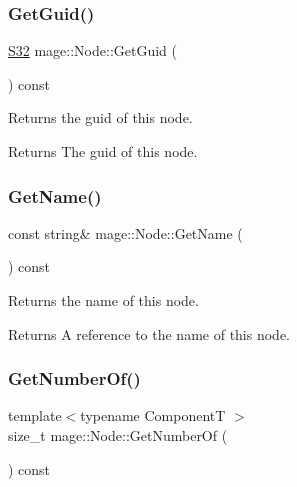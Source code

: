 \subsubsection{\texorpdfstring{Get\+Guid()}{GetGuid()}}
{\footnotesize\ttfamily \hyperlink{namespacemage_a642e05c5c83642b6946703615cdbf2da}{S32} mage\+::\+Node\+::\+Get\+Guid (\begin{DoxyParamCaption}{ }\end{DoxyParamCaption}) const\hspace{0.3cm}{\ttfamily [noexcept]}}

Returns the guid of this node.

\begin{DoxyReturn}{Returns}
The guid of this node. 
\end{DoxyReturn}
\hypertarget{classmage_1_1_node_a206e7c7ef80a0561b31ebbb9d05c98a0}{}\label{classmage_1_1_node_a206e7c7ef80a0561b31ebbb9d05c98a0} 
\subsubsection{\texorpdfstring{Get\+Name()}{GetName()}}
{\footnotesize\ttfamily const string\& mage\+::\+Node\+::\+Get\+Name (\begin{DoxyParamCaption}{ }\end{DoxyParamCaption}) const\hspace{0.3cm}{\ttfamily [noexcept]}}

Returns the name of this node.

\begin{DoxyReturn}{Returns}
A reference to the name of this node. 
\end{DoxyReturn}
\hypertarget{classmage_1_1_node_a0cd486de1639d5af2618ba913124fbe6}{}\label{classmage_1_1_node_a0cd486de1639d5af2618ba913124fbe6} 
\subsubsection{\texorpdfstring{Get\+Number\+Of()}{GetNumberOf()}}
{\footnotesize\ttfamily template$<$typename ComponentT $>$ \\
size\+\_\+t mage\+::\+Node\+::\+Get\+Number\+Of (\begin{DoxyParamCaption}{ }\end{DoxyParamCaption}) const\hspace{0.3cm}{\ttfamily [noexcept]}}

